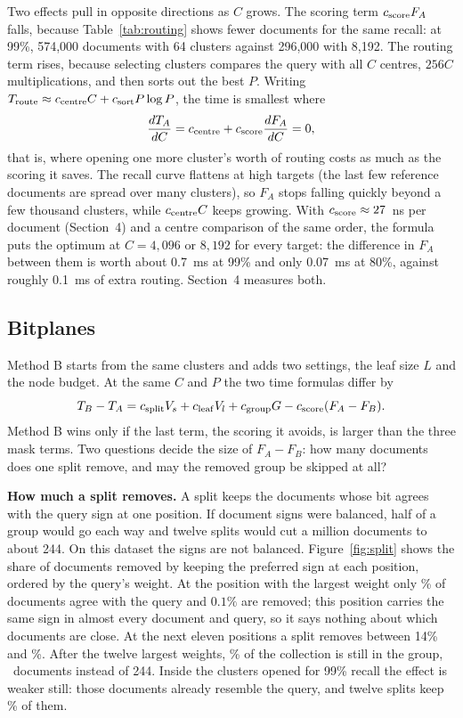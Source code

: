Two effects pull in opposite directions as $C$ grows. The scoring term
$c_{\rm score}F_A$ falls, because Table~\ref{tab:routing} shows fewer documents for the
same recall: at 99\%, 574,000 documents with 64 clusters against 296,000 with 8,192.
The routing term rises, because selecting clusters compares the query with all $C$ centres,
$256C$ multiplications, and then sorts out the best $P$. Writing $T_{\rm route}\approx
c_{\rm centre}C+c_{\rm sort}P\log P$, the time is smallest where
\[
 \frac{dT_A}{dC}=c_{\rm centre}+c_{\rm score}\frac{dF_A}{dC}=0,
\]
that is, where opening one more cluster's worth of routing costs as much as the scoring it
saves. The recall curve flattens at high targets (the last few reference documents are
spread over many clusters), so $F_A$ stops falling quickly beyond a few thousand clusters,
while $c_{\rm centre}C$ keeps growing. With $c_{\rm score}\approx27$~ns per document
(Section~4) and a centre comparison of the same order, the formula puts the optimum at
$C=4{,}096$ or $8{,}192$ for every target: the difference in $F_A$ between them is worth
about 0.7~ms at 99\% and only 0.07~ms at 80\%, against roughly 0.1~ms of extra routing.
Section~4 measures both.

\subsection{Bitplanes}
Method B starts from the same clusters and adds two settings, the leaf size $L$ and the
node budget. At the same $C$ and $P$ the two time formulas differ by
\begin{equation}
 T_B-T_A=c_{\rm split}V_s+c_{\rm leaf}V_l+c_{\rm group}G-c_{\rm score}(F_A-F_B).
 \label{eq:bdiff}
\end{equation}
Method B wins only if the last term, the scoring it avoids, is larger than the three mask
terms. Two questions decide the size of $F_A-F_B$: how many documents does one split remove,
and may the removed group be skipped at all?

\textbf{How much a split removes.} A split keeps the documents whose bit agrees with the
query sign at one position. If document signs were balanced, half of a group would go each
way and twelve splits would cut a million documents to about 244. On this dataset the signs
are not balanced. Figure~\ref{fig:split} shows the share of documents removed by keeping the
preferred sign at each position, ordered by the query's weight. At the position with the
largest weight only \agreeRankOne\% of documents agree with the query and \(0.1\%\) are
removed; this position carries the same sign in almost every document and query, so it says
nothing about which documents are close. At the next eleven positions a split removes
between 14\% and \removedTwelve\%. After the twelve largest weights, \groupTwelveShare\% of
the collection is still in the group, \groupTwelveDocs\ documents instead of 244. Inside
the clusters opened for 99\% recall the effect is weaker still: those documents already
resemble the query, and twelve splits keep \insideShareAfterTwelve\% of them.

